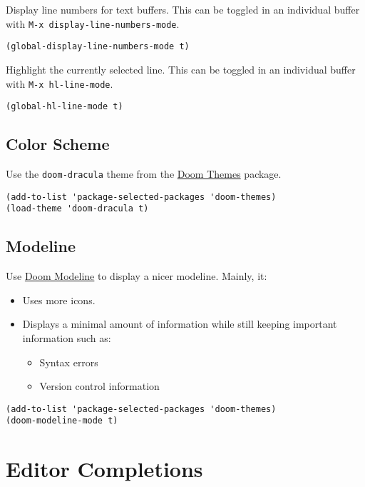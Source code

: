 \documentclass[11pt]{article}
\begin{document}
Display line numbers for text buffers. This can be toggled in an individual
buffer with \texttt{M-x display-line-numbers-mode}.

\begin{verbatim}
(global-display-line-numbers-mode t)
\end{verbatim}

Highlight the currently selected line. This can be toggled in an individual
buffer with \texttt{M-x hl-line-mode}.

\begin{verbatim}
(global-hl-line-mode t)
\end{verbatim}
\subsection{Color Scheme}
\label{sec:org57c4fb2}

Use the \texttt{doom-dracula} theme from the \href{https://github.com/doomemacs/themes/tree/729ad034631cba41602ad9191275ece472c21941}{Doom Themes} package.

\begin{verbatim}
(add-to-list 'package-selected-packages 'doom-themes)
(load-theme 'doom-dracula t)
\end{verbatim}
\subsection{Modeline}
\label{sec:org3911adf}

Use \href{https://github.com/seagle0128/doom-modeline/tree/297b57585fe3b3de9e694512170c44c6e104808f}{Doom Modeline} to display a nicer modeline. Mainly, it:

\begin{itemize}
\item Uses more icons.
\item Displays a minimal amount of information while still keeping
important information such as:
\begin{itemize}
\item Syntax errors
\item Version control information
\end{itemize}
\end{itemize}

\begin{verbatim}
(add-to-list 'package-selected-packages 'doom-themes)
(doom-modeline-mode t)
\end{verbatim}
\section{Editor Completions}
\label{sec:orgff31008}
\end{document}
